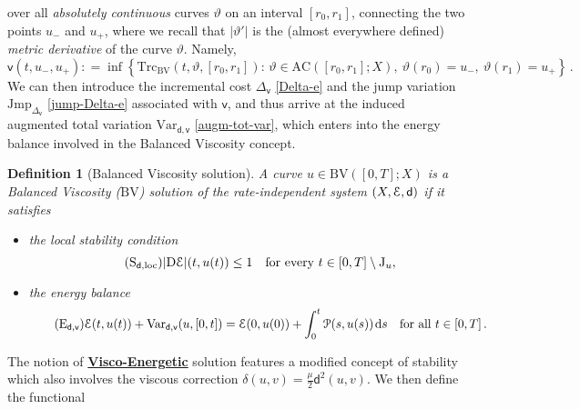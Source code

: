 \documentclass[a4paper,10pt,reqno]{amsart} %
\newtheorem{definition}[theorem]{Definition}
\numberwithin{equation}{section}
\def\rmD{{\mathrm D}} \def\rmE{{\mathrm E}} \def\rmF{{\mathrm F}}
\def\dd{\;\!\mathrm{d}} %
\newcommand{\teta}{\vartheta}
\newcommand{\Xs}{X}
\newcommand{\AC}{\mathrm{AC}}
\newcommand{\BV}{\mathrm{BV}}
\newcommand{\mdn}{\mathsf{d}}
\newcommand{\ene}[2]{\mathcal{E}(#1,#2)}
\newcommand{\pw}[2]{\mathcal{P}(#1,#2)}
\newcommand{\corr}[2]{\delta(#1,#2)}
\newcommand{\Vari}[4]{\mathrm{Var}_{#1}(#2,[#3,#4])}
\newcommand{\Varname}[1]{\mathrm{Var}_{#1}}
\newcommand{\jump}[1]{\mathrm{J}_{#1}}
\newcommand{\bvcostname}{\mathsf{v}}
\newcommand{\bvcost}[3]{\mathsf{v}(#1,#2,#3)}
\newcommand{\RIS}{(\Xs,\calE,\mdn)}
\newcommand{\slope}[3]{|\rmD {#1}|(#2,#3)}
\newcommand{\tcost}[4]{\mathrm{Trc}_{#1}(#2,#3,#4)}
\newcommand{\RRR}{\color{red}}
\newcommand{\EEE}{\color{black}}
\begin{document}
 over all \emph{absolutely continuous} curves $\teta$ on an interval $[r_0,r_1]$, connecting the two points $u_-$ and $u_+$, where we recall that  $ |\teta'|$ is the (almost everywhere defined) \emph{metric derivative} of the  curve $\teta$. 
 Namely,
 \begin{equation}
 \label{vcost}
 \bvcost t{u_-}{u_+}: = \inf\left\{ \tcost{\BV}{t}{\teta}{[r_0,r_1]}
   : \,  \teta \in \AC([r_0,r_1];\Xs),  \ \teta(r_0)=u_-, \ \teta(r_1) = u_+\right\}\,.
\end{equation}
We can then introduce the incremental cost   $\Delta_{\bvcostname}$ \eqref{Delta-e} and the  jump variation $\mathrm{Jmp}_{\Delta_{\bvcostname}}$ \eqref{jump-Delta-e} associated with $\bvcostname$, and thus arrive at the induced augmented total variation $\Varname{\mdn,\bvcostname}$ \eqref{augm-tot-var}, which enters into the energy balance involved in the Balanced Viscosity concept.
\begin{definition}[Balanced Viscosity solution]
\label{def:bv-sol}
A curve $u\in \BV([0,T];X)$ is a Balanced Viscosity ($\BV$) solution of the rate-independent system $\RIS$
if it satisfies
\begin{itemize}
\item[-] the local stability condition
\begin{equation}
\label{loc-stab}
\tag{$\mathrm{S}_{\mdn,\mathrm{loc}}$}
\slope \calE t{u(t)} \leq 1 \quad \text{for every } t \in [0,T]\setminus \jump u,
\end{equation}
\item[-]  the energy balance
\begin{equation}
\label{BV-enbal}
\tag{$\mathrm{E}_{\mdn,\bvcostname}$}
\ene t{u(t)} + \Vari {\mdn,\bvcostname}{u}0{t} = \ene 0{u(0)} +\int_0^t \pw s{u(s)} \dd s \quad \text{for all } t \in [0,T]\,.
\end{equation}
\end{itemize}
\end{definition} 
\par
The notion of \underline{\textbf{Visco-Energetic}} solution features a modified concept of stability which also involves the viscous correction $\corr uv = \tfrac \mu2 \mdn^2(u,v)$.
We then define the functional
\end{document}
